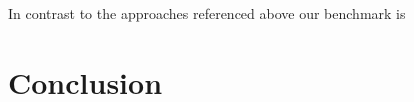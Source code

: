 \documentclass[conference]{IEEEtran}
\begin{document}
In contrast to the approaches referenced above our benchmark is 


\section{Conclusion}



%





\end{document}

